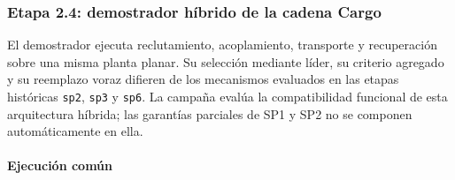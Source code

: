 

\subsubsection{Etapa 2.4: demostrador híbrido de la cadena Cargo}
\label{subsubsec:sp2-cargo-e2e}

El demostrador ejecuta reclutamiento, acoplamiento, transporte y recuperación sobre una misma planta planar. Su selección mediante líder, su criterio agregado y su reemplazo voraz difieren de los mecanismos evaluados en las etapas históricas \texttt{sp2}, \texttt{sp3} y \texttt{sp6}. La campaña evalúa la compatibilidad funcional de esta arquitectura híbrida; las garantías parciales de SP1 y SP2 no se componen automáticamente en ella.

\paragraph{Ejecución común}

